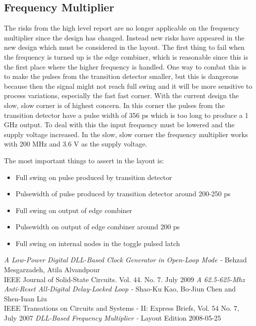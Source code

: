 \documentclass[a4paper,12pt]{article} \usepackage{graphicx}
\begin{document}
\subsection{Frequency Multiplier}
The risks from the high level report are no longer applicable on the frequency
multiplier since the design has changed. Instead new risks have appeared in the
new design which must be considered in the layout. The first thing to fail when
the frequency is turned up is the edge combiner, which is reasonable since this
is the first place where the higher frequency is handled. One way to combat this
is to make the pulses from the transition detector smaller, but this is
dangerous because then the signal might not reach full swing and it will be more
sensitive to process variations, especially the fast fast corner. With the
current design the slow, slow corner is of highest concern. In this corner the
pulses from the transition detector have a pulse width of 356 ps which is too
long to produce a 1 GHz output. To deal with this the input frequency must be
lowered and the supply voltage increased. In the slow, slow corner the frequency
multiplier works with 200 MHz and 3.6 V as the supply voltage.

The most important things to assert in the layout is:
\begin{itemize}
        \item Full swing on pulse produced by transition detector
        \item Pulsewidth of pulse produced by transition detector around 200-250 ps
        \item Full swing on output of edge combiner
        \item Pulsewidth on output of edge combiner around 200 ps
        \item Full swing on internal nodes in the toggle pulsed latch
\end{itemize}

\newpage 
\appendix 
\newpage

\begin{thebibliography}{99}
        \textit{A Low-Power Digital DLL-Based Clock Generator in Open-Loop Mode - }
                Behzad Mesgarzadeh, Atila Alvandpour \\
                IEEE Journal of Solid-State Circuits. Vol. 44. No. 7. July 2009
        \textit{A 62.5-625-Mhz Anti-Reset All-Digital Delay-Locked Loop - }
                Shao-Ku Kao, Bo-Jiun Chen and Shen-Iuan Liu \\
                IEEE Transations on Circuits and Systems - II: Express Briefs, Vol. 54 No. 7, July 2007
        \textit{DLL-Based Frequency Multiplier - }
                Layout Edition 2008-05-25 

\end{thebibliography}
\end{document}
